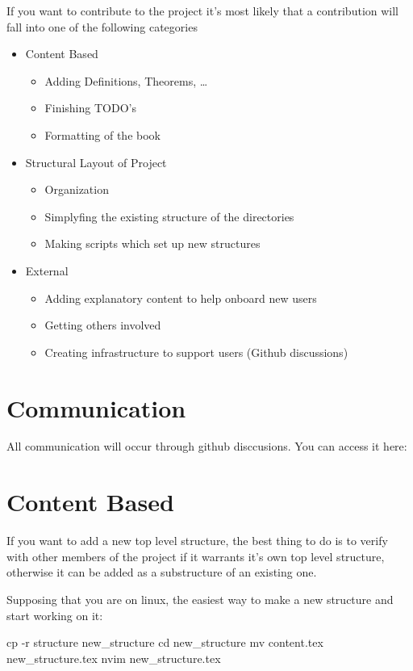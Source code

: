 If you want to contribute to the project it's most likely that a contribution will fall into one of the following categories
\begin{itemize}
  \item Content Based 
  \begin{itemize}
      \item Adding Definitions, Theorems, \ldots
      \item Finishing TODO's
      \item Formatting of the book
  \end{itemize}
  \item Structural Layout of Project 
  \begin{itemize}
      \item Organization
      \item Simplyfing the existing structure of the directories 
      \item Making scripts which set up new structures
  \end{itemize}
  \item External
  \begin{itemize}
      \item Adding explanatory content to help onboard new users
      \item Getting others involved
      \item Creating infrastructure to support users (Github discussions)
  \end{itemize}
\end{itemize}

\section*{Communication}

All communication will occur through github disccusions. You can access it here: 

\section*{Content Based}

If you want to add a new top level structure, the best thing to do is to verify with other members of the project if it warrants it's own top level structure, otherwise it can be added as a substructure of an existing one.

Supposing that you are on linux, the easiest way to make a new structure and start working on it:

\begin{term}
cp -r structure new_structure
cd new_structure
mv content.tex new_structure.tex
nvim new_structure.tex
\end{term}

